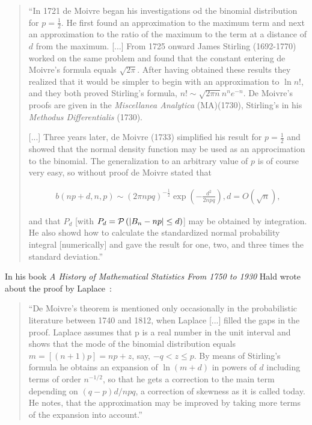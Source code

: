 \begin{quotation}
  ``In 1721 de Moivre began his investigations od the binomial distribution for $p=\tfrac 12$. He first found an approximation to the maximum term and next an approximation to the ratio of the maximum to the term at a distance of $d$ from the maximum. [...] From 1725 onward James Stirling (1692-1770) worked on the same problem and found that the constant entering de Moivre's formula equals $\sqrt{2\pi}$. After having obtained these results they realized that it would be simpler to begin with an approximation to $\ln n!$, and they both proved Stirling's formula, $n! \sim \sqrt{2\pi n}n^ne^{-n}$. De Moivre's proofs are given in the \emph{Miscellanea Analytica} (MA)(1730), Stirling's in his \emph{Methodus Differentialis} (1730).

  [...] Three years later, de Moivre (1733) simplified his result for $p=\tfrac 12$ and showed that the normal density function may be used as an approcimation to the binomial. The generalization to an arbitrary value of $p$ is of course very easy, so without proof de Moivre stated that

  \begin{align*}
      b(np+d,n,p) \sim (2\pi npq)^{-\tfrac 12} \exp\left( -\frac{d^2}{2npq} \right), d = O(\sqrt n),
  \end{align*}

  and that $P_d$ [with $P_d=\mathcal P\left({|B_{n} -np|\le d}\right)$] may be obtained by integration. He also showd how to calculate the standardized normal probability integral [numerically] and gave the result for one, two, and three times the standard deviation.''
\end{quotation}

In his book \emph{A History of Mathematical Statistics From 1750 to 1930} Hald wrote about the proof by Laplace~\cite[p. 24]{hald2}:

\begin{quote}
  ``De Moivre's theorem is mentioned only occasionally in the probabilistic literature between 1740 and 1812, when Laplace [...] filled the gaps in the proof. Laplace assumes that p is a real number in the unit interval  and shows that the mode of the binomial distribution equals $m=[(n+1)p]=np+z$, say, $-q < z \le p$. By means of Stirling's formula he obtains an expansion of $\ln(m+d)$ in powers of $d$ including terms of order $n^{-1/2}$, so that he gets a correction to the main term depending on $(q-p)d/npq$, a correction of skewness as it is called today. He notes, that the approximation may be improved by taking more terms of the expansion into account.''
\end{quote}

